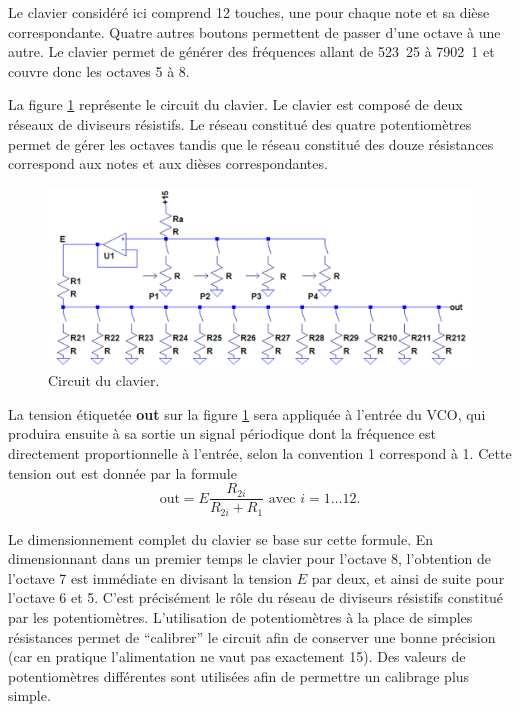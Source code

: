 
Le clavier considéré ici comprend 12 touches, une pour
chaque note et sa dièse correspondante. Quatre autres
boutons permettent de passer d'une octave à une autre.
Le clavier permet de générer des fréquences allant de
\unit{523.25}{\hertz} à \unit{7902.1}{\hertz} et couvre
donc les octaves 5 à 8.


La figure \ref{fig:keyboard-circuit} représente le
circuit du clavier. Le clavier est composé de deux
réseaux de diviseurs résistifs. Le réseau constitué
des quatre potentiomètres permet de gérer les octaves
tandis que le réseau constitué des douze résistances
correspond aux notes et aux dièses correspondantes.

\begin{figure}[ht]
	\centering
	\includegraphics[scale=0.55]{kb-img/keyboard-circuit.png}
	\caption{Circuit du clavier.}
	\label{fig:keyboard-circuit}
\end{figure}

La tension étiquetée \textbf{out} sur la figure
\ref{fig:keyboard-circuit} sera appliquée à l'entrée
du VCO, qui produira ensuite à sa sortie un signal
périodique dont la fréquence est directement 
proportionnelle à l'entrée, selon la convention
\unit{1}{\milli\volt} correspond à \unit{1}{\hertz}. Cette
tension $\text{out}$ est donnée par la formule 
\[ \text{out} = E\frac{R_{2i}}{R_{2i} + R_1} \text{  avec  } i = 1\dots12. \]

Le dimensionnement complet du clavier se base
sur cette formule. En dimensionnant dans un premier
temps le clavier pour l'octave 8, l'obtention
de l'octave 7 est immédiate en divisant la tension
$E$ par deux, et ainsi de suite pour l'octave 6 et 5.
C'est précisément le rôle du réseau de diviseurs
résistifs constitué par les potentiomètres. L'utilisation
de potentiomètres à la place de simples résistances
permet de ``calibrer'' le circuit afin de conserver
une bonne précision (car en pratique l'alimentation
ne vaut pas exactement \unit{15}{\volt}).
Des valeurs de potentiomètres différentes sont utilisées
afin de permettre un calibrage plus simple.

